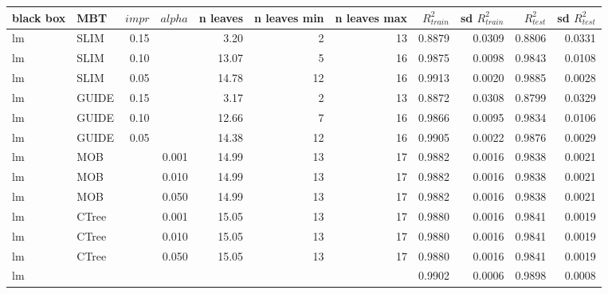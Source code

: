 \begin{table}[!htb]

\centering \tiny
\begin{tabular}[t]{l|l|r|r|r|r|r|r|r|r|r}
\hline
black box & MBT & $impr$ & $alpha$ & n leaves & n leaves min & n leaves max &  $R^2_{train}$ & sd $R^2_{train}$ & $R^2_{test}$ & sd $R^2_{test}$\\
\hline
lm & SLIM & 0.15 & & 3.20 & 2 & 13 & 0.8879 & 0.0309 & 0.8806 & 0.0331\\
lm & SLIM & 0.10 & & 13.07 & 5 & 16 & 0.9875 & 0.0098 & 0.9843 & 0.0108\\
lm & SLIM & 0.05 & & 14.78 & 12 & 16 & 0.9913 & 0.0020 & 0.9885 & 0.0028\\
lm & GUIDE & 0.15 & & 3.17 & 2 & 13 & 0.8872 & 0.0308 & 0.8799 & 0.0329\\
lm & GUIDE & 0.10 & & 12.66 & 7 & 16 & 0.9866 & 0.0095 & 0.9834 & 0.0106\\
lm & GUIDE & 0.05 & & 14.38 & 12 & 16 & 0.9905 & 0.0022 & 0.9876 & 0.0029\\
lm & MOB & & 0.001 & 14.99 & 13 & 17 & 0.9882 & 0.0016 & 0.9838 & 0.0021\\
lm & MOB & & 0.010 & 14.99 & 13 & 17 & 0.9882 & 0.0016 & 0.9838 & 0.0021\\
lm & MOB & & 0.050 & 14.99 & 13 & 17 & 0.9882 & 0.0016 & 0.9838 & 0.0021\\
lm & CTree & & 0.001 & 15.05 & 13 & 17 & 0.9880 & 0.0016 & 0.9841 & 0.0019\\
lm & CTree & & 0.010 & 15.05 & 13 & 17 & 0.9880 & 0.0016 & 0.9841 & 0.0019\\
lm & CTree & & 0.050 & 15.05 & 13 & 17 & 0.9880 & 0.0016 & 0.9841 & 0.0019\\

\hline
lm & & & & & & & 0.9902 & 0.0006 & 0.9898 & 0.0008\\
\hline



\end{tabular}
\end{table}
